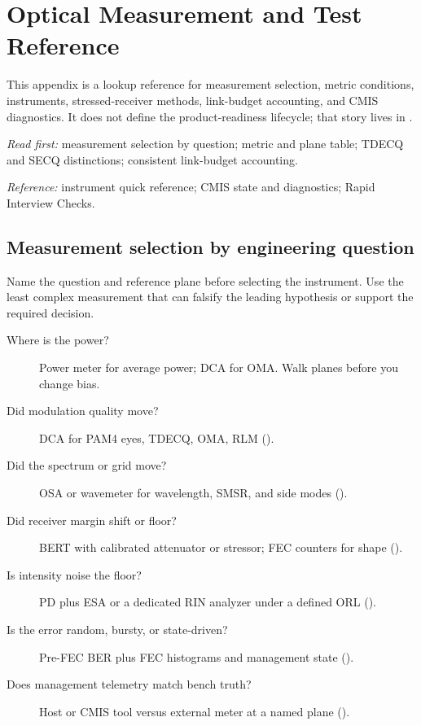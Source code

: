 \chapter{Optical Measurement and Test Reference}
\label{app:measurement-reference}

This appendix is a lookup reference for measurement selection, metric
conditions, instruments, stressed-receiver methods, link-budget accounting,
and CMIS diagnostics. It does not define the product-readiness lifecycle;
that story lives in .

\textit{Read first:} measurement selection by question; metric and plane table;
TDECQ and SECQ distinctions; consistent link-budget accounting.

\textit{Reference:} instrument quick reference; CMIS state and diagnostics;
Rapid Interview Checks.

\section{Measurement selection by engineering question}
\label{sec:instruments}

Name the question and reference plane before selecting the instrument. Use the
least complex measurement that can falsify the leading hypothesis or support
the required decision.

\begin{description}
\item[Where is the power?] Power meter for average power; DCA for OMA. Walk
      planes before you change bias.
\item[Did modulation quality move?] DCA for PAM4 eyes, TDECQ, OMA, RLM
      ().
\item[Did the spectrum or grid move?] OSA or wavemeter for wavelength, SMSR,
      and side modes ().
\item[Did receiver margin shift or floor?] BERT with calibrated attenuator or
      stressor; FEC counters for shape
      ().
\item[Is intensity noise the floor?] PD plus ESA or a dedicated RIN analyzer
      under a defined ORL ().
\item[Is the error random, bursty, or state-driven?] Pre-FEC BER plus FEC
      histograms and management state ().
\item[Does management telemetry match bench truth?] Host or CMIS tool versus
      external meter at a named plane ().
\end{description}

